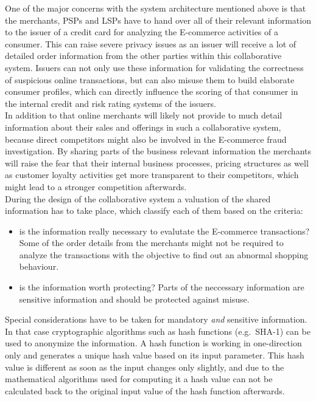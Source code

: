 One of the major concerns with the system architecture mentioned above is that the merchants, \gls{PSP}s and \gls{LSP}s have to hand over all of their relevant information to the issuer of a credit card for analyzing the \gls{E-commerce} activities of a consumer. This can raise severe privacy issues as an issuer will receive a lot of detailed order information from the other parties within this collaborative system. Issuers can not only use these information for validating the correctness of suspicious online transactions, but can also misuse them to build elaborate consumer profiles, which can directly influence the scoring of that consumer in the internal credit and risk rating systems of the issuers. \\

In addition to that online merchants will likely not provide to much detail information about their sales and offerings in such a collaborative system, because direct competitors might also be involved in the \gls{E-commerce} fraud investigation. By sharing parts of the business relevant information the merchants will raise the fear that their internal business processes, pricing structures as well as customer loyalty activities get more transparent to their competitors, which might lead to a stronger competition afterwards. \\

During the design of the collaborative system a valuation of the shared information has to take place, which classify each of them based on the criteria: \@

\begin{itemize}
	\item is the information really necessary to evalutate the \gls{E-commerce} transactions? Some of the order details from the merchants might not be required to analyze the transactions with the objective to find out an abnormal shopping behaviour.
	\item is the information worth protecting? Parts of the neccessary information are sensitive information and should be protected against misuse.
\end{itemize}

Special considerations have to be taken for mandatory \emph{and} sensitive information. In that case cryptographic algorithms such as hash functions (e.g.\ \gls{SHA-1}) can be used to anonymize the information. A hash function is working in one-direction only and generates a unique hash value based on its input parameter. This hash value is different as soon as the input changes only slightly, and due to the mathematical algorithms used for computing it a hash value can not be calculated back to the original input value of the hash function afterwards. \\


